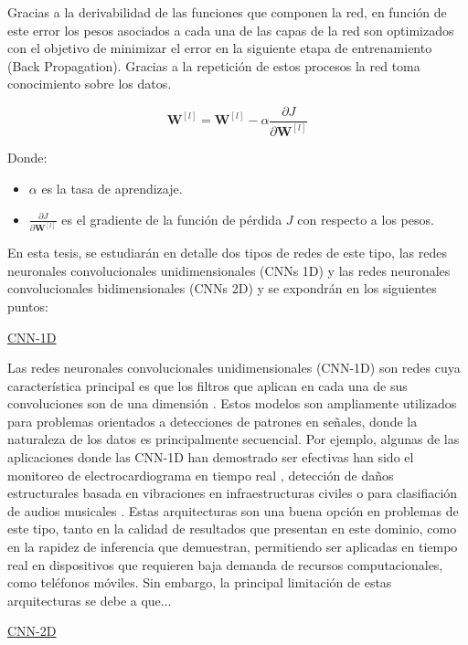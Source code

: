 \documentclass{uathesis-es}
\begin{document}
{	
	Gracias a la derivabilidad de las funciones que componen la red, en función de este error los pesos asociados a cada una de las capas de la red son optimizados con el objetivo de minimizar el error en la siguiente etapa de entrenamiento (Back Propagation). Gracias a la repetición de estos procesos la red toma conocimiento sobre los datos.
	
	
	\[
	\mathbf{W}^{[l]} = \mathbf{W}^{[l]} - \alpha \frac{\partial J}{\partial \mathbf{W}^{[l]}}
	\]
	
	Donde:
	\begin{itemize}
		\item \(\alpha\) es la tasa de aprendizaje.
		\item \(\frac{\partial J}{\partial \mathbf{W}^{[l]}}\) es el gradiente de la función de pérdida \(J\) con respecto a los pesos.
	\end{itemize}
	
	En esta tesis, se estudiarán en detalle dos tipos de redes de este tipo, las redes neuronales convolucionales unidimensionales (CNNs 1D) y las redes neuronales convolucionales bidimensionales (CNNs 2D) y se expondrán en los siguientes puntos:
	
	\underline{CNN-1D}
	
	Las redes neuronales convolucionales unidimensionales (CNN-1D) son redes cuya característica principal es que los filtros que aplican en cada una de sus convoluciones son de una dimensión \cite{CNN1D}. Estos modelos son ampliamente utilizados para problemas orientados a detecciones de patrones en señales, donde la naturaleza de los datos es principalmente secuencial. Por ejemplo, algunas de las aplicaciones donde las CNN-1D han demostrado ser efectivas han sido el monitoreo de electrocardiograma en tiempo real \cite{Kiranyaz2017tt}, detección de daños estructurales basada en vibraciones en infraestructuras civiles \cite{khodabandehlou2019vibration} o para clasifiación de audios musicales \cite{allamy20211d}. Estas arquitecturas son una buena opción en problemas de este tipo, tanto en la calidad de resultados que presentan en este dominio, como en la rapidez de inferencia que demuestran, permitiendo ser aplicadas en tiempo real en dispositivos que requieren baja demanda de recursos computacionales, como teléfonos móviles. Sin embargo, la principal limitación de estas arquitecturas se debe a que...
	
	
	\underline{CNN-2D}
	
}
\end{document}
